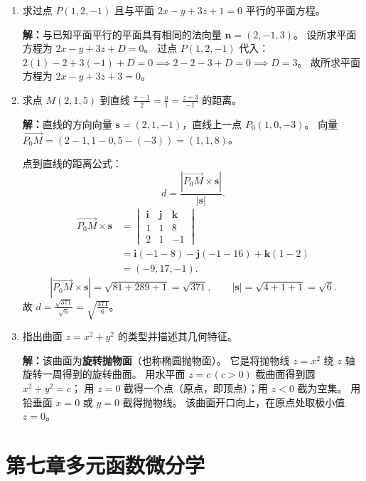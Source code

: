 \documentclass[12pt,a4paper]{ctexart}
\begin{document}
\begin{enumerate}[leftmargin=*,label=\arabic*.,start=32]
  \item 求过点 $P(1,2,-1)$ 且与平面 $2x - y + 3z + 1 = 0$ 平行的平面方程。

    \textbf{解：}与已知平面平行的平面具有相同的法向量 $\mathbf{n} = (2,-1,3)$。
    设所求平面方程为 $2x - y + 3z + D = 0$。
    过点 $P(1,2,-1)$ 代入：
    $2(1) - 2 + 3(-1) + D = 0 \implies 2-2-3+D=0 \implies D = 3$。
    故所求平面方程为 $2x - y + 3z + 3 = 0$。

  \item 求点 $M(2,1,5)$ 到直线 $\frac{x-1}{2} = \frac{y}{1} = \frac{z+3}{-1}$ 的距离。

    \textbf{解：}直线的方向向量 $\mathbf{s} = (2,1,-1)$，直线上一点 $P_0(1,0,-3)$。
    向量 $\overrightarrow{P_0M} = (2-1, 1-0, 5-(-3)) = (1,1,8)$。

    点到直线的距离公式：
    \[
    d = \frac{|\overrightarrow{P_0M} \times \mathbf{s}|}{|\mathbf{s}|}.
    \]
    \begin{align*}
      \overrightarrow{P_0M} \times \mathbf{s}
      &= \begin{vmatrix} \mathbf{i} & \mathbf{j} & \mathbf{k} \\ 1 & 1 & 8 \\ 2 & 1 & -1 \end{vmatrix} \\
      &= \mathbf{i}(-1-8) - \mathbf{j}(-1-16) + \mathbf{k}(1-2) \\
      &= (-9, 17, -1).
    \end{align*}
    \[
    |\overrightarrow{P_0M} \times \mathbf{s}| = \sqrt{81+289+1} = \sqrt{371},
    \qquad |\mathbf{s}| = \sqrt{4+1+1} = \sqrt{6}.
    \]
    故 $d = \frac{\sqrt{371}}{\sqrt{6}} = \sqrt{\frac{371}{6}}$。

  \item 指出曲面 $z = x^2 + y^2$ 的类型并描述其几何特征。

    \textbf{解：}该曲面为\textbf{旋转抛物面}（也称椭圆抛物面）。
    它是将抛物线 $z = x^2$ 绕 $z$ 轴旋转一周得到的旋转曲面。
    用水平面 $z = c\,(c>0)$ 截曲面得到圆 $x^2+y^2=c$；
    用 $z=0$ 截得一个点（原点，即顶点）；用 $z<0$ 截为空集。
    用铅垂面 $x=0$ 或 $y=0$ 截得抛物线。
    该曲面开口向上，在原点处取极小值 $z=0$。
\end{enumerate}

\section*{第七章\quad 多元函数微分学}
\end{document}
